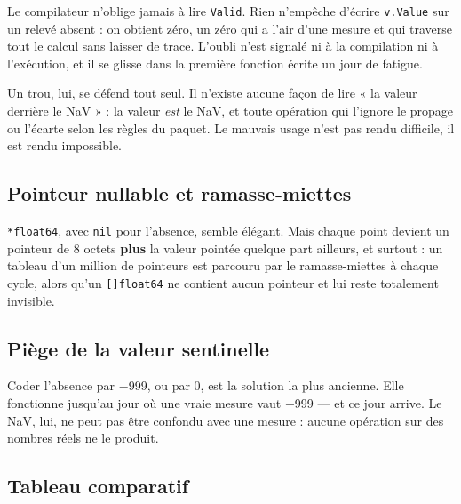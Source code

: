 \documentclass[11pt,a4paper]{report}
\begin{document}
Le compilateur n'oblige jamais à lire \texttt{Valid}. Rien n'empêche
d'écrire \texttt{v.Value} sur un relevé absent : on obtient zéro, un
zéro qui a l'air d'une mesure et qui traverse tout le calcul sans
laisser de trace. L'oubli n'est signalé ni à la compilation ni à
l'exécution, et il se glisse dans la première fonction écrite un jour de
fatigue.

Un trou, lui, se défend tout seul. Il n'existe aucune façon de lire « la
valeur derrière le NaV » : la valeur \emph{est} le NaV, et toute
opération qui l'ignore le propage ou l'écarte selon les règles du
paquet. Le mauvais usage n'est pas rendu difficile, il est rendu
impossible.

\subsection{Pointeur nullable et ramasse-miettes}

\texttt{*float64}, avec \texttt{nil} pour l'absence, semble élégant.
Mais chaque point devient un pointeur de 8 octets \textbf{plus} la
valeur pointée quelque part ailleurs, et surtout : un tableau d'un
million de pointeurs est parcouru par le ramasse-miettes à chaque cycle,
alors qu'un \texttt{[]float64} ne contient aucun pointeur et lui
reste totalement invisible.

\subsection{Piège de la valeur sentinelle}

Coder l'absence par −999, ou par 0, est la solution la plus ancienne.
Elle fonctionne jusqu'au jour où une vraie mesure vaut −999 --- et ce
jour arrive. Le NaV, lui, ne peut pas être confondu avec une mesure :
aucune opération sur des nombres réels ne le produit.

\subsection{Tableau comparatif}
\end{document}
